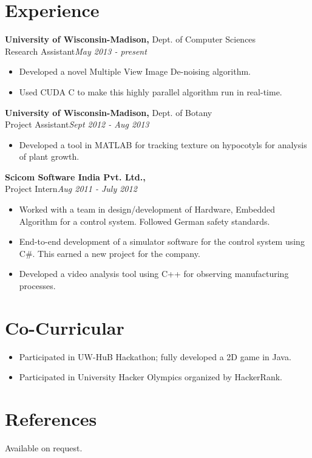 \documentclass[margin]{res}
\begin{document}
\begin{resume}
\section{Experience}
 {\bf University of Wisconsin-Madison,} Dept. of Computer Sciences \\
Research Assistant\hfill {\it May 2013 - present}
 \begin{itemize} \itemsep -2pt  %
 \item Developed a novel Multiple View Image De-noising algorithm.
 \item Used CUDA C to make this highly parallel algorithm run in real-time. 
 \end{itemize}

  {\bf University of Wisconsin-Madison,} Dept. of Botany \\
Project Assistant\hfill {\it Sept 2012 - Aug 2013}
 \begin{itemize} \itemsep -2pt  %
 \item Developed a tool in MATLAB for tracking texture on hypocotyls for analysis of plant growth.
 \end{itemize}
  {\bf Scicom Software India Pvt. Ltd.,} \\
Project Intern\hfill{\it Aug 2011 - July 2012}
 \begin{itemize} \itemsep -2pt  %
 \item Worked with a team in design/development of Hardware, Embedded Algorithm for a control system. Followed German safety standards.
 \item End-to-end development of a simulator software for the control system using C\#. This earned a new project for the company.
 \item Developed a video analysis tool using C++ for observing manufacturing processes.
 \end{itemize}

\section{Co-Curricular}
\begin{itemize} \itemsep -2pt  %
 \item Participated in UW-HuB Hackathon; fully developed a 2D game in Java.
 \item Participated in University Hacker Olympics organized by HackerRank.
 \end{itemize}

 \section{References}
Available on request.


\end{resume} 
\end{document}
